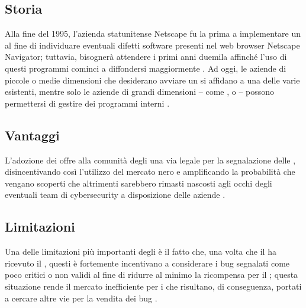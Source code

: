 \subsection{Storia}


Alla fine del 1995, l'azienda statunitense Netscape fu la prima a implementare un \BBP al fine di individuare eventuali difetti software presenti nel web browser Netscape Navigator; tuttavia, bisognerà attendere i primi anni duemila affinché l'uso di questi programmi cominci a diffondersi maggiormente \cite{hoffman2021bountychain}.
Ad oggi, le aziende di piccole o medie dimensioni che desiderano avviare un \BBP si affidano a una delle varie \bugbountyplatform esistenti, mentre solo le aziende di grandi dimensioni -- come \GoogleBBP, \MetaBBP o {\MicrosoftBBP} -- possono permettersi di gestire dei programmi interni \cite{walshe2023bountythesis3}.

\subsection{Vantaggi}


L'adozione dei \BBP offre alla comunità degli \hacker una via legale per la segnalazione delle \vulnerability, disincentivando così l'utilizzo del mercato nero \cite{fryer2017bugbounty, walshe2020bountypaper, walshe2023bountythesis3} e amplificando la probabilità che vengano scoperti \bug che altrimenti sarebbero rimasti nascosti agli occhi degli eventuali team di cybersecurity a disposizione delle aziende \cite{walshe2020bountypaper}.

\subsection{Limitazioni}

Una delle limitazioni più importanti degli \internalBBP è il fatto che, una volta che il \BI ha ricevuto il \bugreport, questi è fortemente incentivano a considerare i bug segnalati come poco critici o non validi al fine di ridurre al minimo la ricompensa per il \BH \cite{canidio2021verioss, akgul2023bughunters}; questa situazione rende il mercato inefficiente per i \BH che risultano, di conseguenza, portati a cercare altre vie per la vendita dei bug \cite{canidio2021verioss}.

